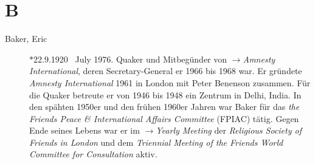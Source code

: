 \section*{B}

\articlesize

\begin{description}

 \item[Baker, Eric] $\ast$22.9.1920 \dag~July 1976. Quaker und Mitbegünder von $\to$\textit{Amnesty International}, deren Secretary-General er 1966 bis 1968 war. Er gründete \textit{Amnesty International} 1961 in London mit Peter Benenson zusammen. Für die Quaker betreute er von 1946 bis 1948 ein Zentrum in Delhi, India. In den spähten 1950er und den frühen 1960er Jahren war Baker für das \textit{the Friends Peace \& International Affairs Committee} (FPIAC) tätig. Gegen Ende seines Lebens war er im $\to$\textit{Yearly Meeting} der \textit{Religious Society of Friends in London} und dem \textit{Triennial Meeting of the Friends World Committee for Consultation} aktiv.


\end{description}
